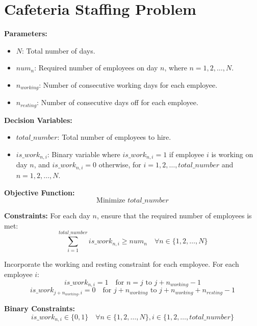\documentclass{article}
\begin{document}
\section*{Cafeteria Staffing Problem}

\textbf{Parameters:}
\begin{itemize}
    \item $N$: Total number of days.
    \item $num_n$: Required number of employees on day $n$, where $n = 1, 2, \ldots, N$.
    \item $n_{working}$: Number of consecutive working days for each employee.
    \item $n_{resting}$: Number of consecutive days off for each employee.
\end{itemize}

\textbf{Decision Variables:}
\begin{itemize}
    \item $total\_number$: Total number of employees to hire.
    \item $is\_work_{n,i}$: Binary variable where $is\_work_{n,i} = 1$ if employee $i$ is working on day $n$, and $is\_work_{n,i} = 0$ otherwise, for $i = 1, 2, \ldots, total\_number$ and $n = 1, 2, \ldots, N$.
\end{itemize}

\textbf{Objective Function:}
\[
\text{Minimize } total\_number
\]

\textbf{Constraints:}
For each day $n$, ensure that the required number of employees is met:
\[
\sum_{i=1}^{total\_number} is\_work_{n,i} \geq num_n \quad \forall n \in \{1, 2, \ldots, N\}
\]

Incorporate the working and resting constraint for each employee. For each employee $i$:
\[
is\_work_{n,i} = 1 \quad \text{for } n = j \text{ to } j+n_{working}-1
\]
\[
is\_work_{j+n_{working},i} = 0 \quad \text{for } j+n_{working} \text{ to } j+n_{working}+n_{resting}-1
\]

\textbf{Binary Constraints:}
\[
is\_work_{n,i} \in \{0, 1\} \quad \forall n \in \{1, 2, \ldots, N\}, i \in \{1, 2, \ldots, total\_number\}
\]
\end{document}
